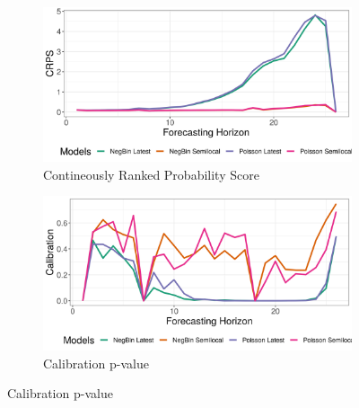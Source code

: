 \begin{figure}[H]
\begin{subfigure}{0.5\textwidth}
  \centering
  \includegraphics[width=\linewidth]{../output/Lolwa_crps.png}  
  \caption{Contineously Ranked Probability Score}
  \label{Lolwa_scores_1}
\end{subfigure}
\begin{subfigure}{0.5\textwidth}
  \centering
  \includegraphics[width=\linewidth]{../output/Lolwa_calibration.png}  
  \caption{Calibration p-value}
  \label{Lolwa_scores_2}
\end{subfigure}


\end{figure}
